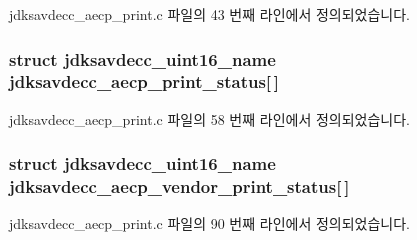 jdksavdecc\+\_\+aecp\+\_\+print.\+c 파일의 43 번째 라인에서 정의되었습니다.

\subsubsection[{\texorpdfstring{jdksavdecc\+\_\+aecp\+\_\+print\+\_\+status}{jdksavdecc_aecp_print_status}}]{\setlength{\rightskip}{0pt plus 5cm}struct {\bf jdksavdecc\+\_\+uint16\+\_\+name} jdksavdecc\+\_\+aecp\+\_\+print\+\_\+status\mbox{[}$\,$\mbox{]}}\hypertarget{group__aecp__print_ga3f478fcbbe933768f463bef56b4d98a8}{}\label{group__aecp__print_ga3f478fcbbe933768f463bef56b4d98a8}


jdksavdecc\+\_\+aecp\+\_\+print.\+c 파일의 58 번째 라인에서 정의되었습니다.

\subsubsection[{\texorpdfstring{jdksavdecc\+\_\+aecp\+\_\+vendor\+\_\+print\+\_\+status}{jdksavdecc_aecp_vendor_print_status}}]{\setlength{\rightskip}{0pt plus 5cm}struct {\bf jdksavdecc\+\_\+uint16\+\_\+name} jdksavdecc\+\_\+aecp\+\_\+vendor\+\_\+print\+\_\+status\mbox{[}$\,$\mbox{]}}\hypertarget{group__aecp__print_gaca25183a2710580e271aa36225535463}{}\label{group__aecp__print_gaca25183a2710580e271aa36225535463}


jdksavdecc\+\_\+aecp\+\_\+print.\+c 파일의 90 번째 라인에서 정의되었습니다.

